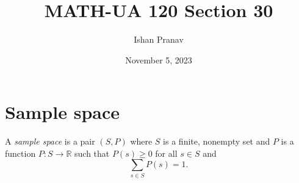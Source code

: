 \documentclass[12pt]{article}
\title{MATH-UA 120 Section 30}
\author{Ishan Pranav}
\date{November 5, 2023}
\begin{document}
\maketitle
\section*{Sample space}
A \textit{sample space} is a pair $(S,P)$ where $S$ is a finite, nonempty set and $P$ is a function $P:S\to\mathbb{R}$ such that $P(s)\geq 0$ for all $s\in S$ and
\[\sum_{s\in S}{P(s)}=1.\]
\end{document}
